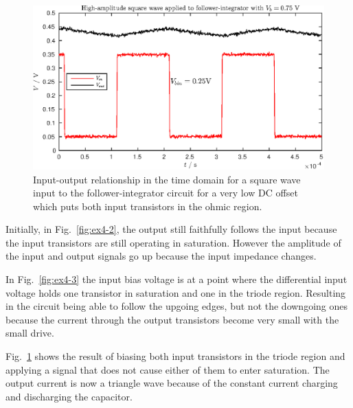 \begin{figure}[!htb]
    \center
    \includegraphics{ex4-3.eps}
    \caption{Input-output relationship in the time domain for a square wave input to the follower-integrator circuit for a very low DC offset which puts both
    input transistors in the ohmic region.}
    \label{fig:ex4-4}
\end{figure}
Initially, in Fig.~\ref{fig:ex4-2}, the output still faithfully follows the input because the input transistors are still operating in saturation. However the 
amplitude of the input and output signals go up because the input impedance changes.

In Fig.~\ref{fig:ex4-3} the input bias voltage is at a point where the differential input voltage holds one transistor in saturation and one in the triode region.
Resulting in the circuit being able to follow the upgoing edges, but not the downgoing ones because the current through the output transistors become very small
with the small drive.

Fig.~\ref{fig:ex4-4} shows the result of biasing both input transistors in the triode region and applying a signal that does not cause either of them to enter
saturation. The output current is now a triangle wave because of the constant current charging and discharging the capacitor.

